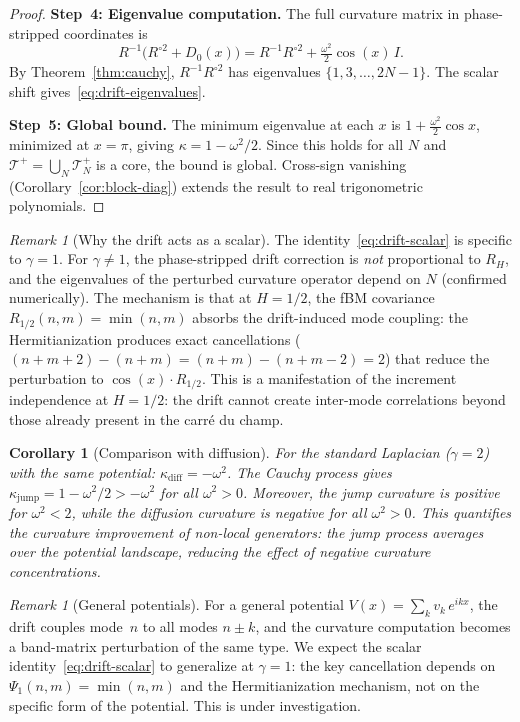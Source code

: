 \documentclass[11pt,a4paper]{article}
\theoremstyle{plain}
\newtheorem{corollary}[theorem]{Corollary}
\theoremstyle{definition}
\theoremstyle{remark}
\newtheorem{remark}[theorem]{Remark}
\begin{document}
\begin{proof}
\textbf{Step~4: Eigenvalue computation.}
The full curvature matrix in phase-stripped coordinates is
\[
  R^{-1}\bigl(R^{\circ 2} + D_0(x)\bigr)
  = R^{-1}R^{\circ 2} + \tfrac{\omega^2}{2}\cos(x)\,I.
\]
By Theorem~\ref{thm:cauchy}, $R^{-1}R^{\circ 2}$ has eigenvalues
$\{1,3,\ldots,2N{-}1\}$.  The scalar shift
gives~\eqref{eq:drift-eigenvalues}.

\textbf{Step~5: Global bound.}
The minimum eigenvalue at each $x$ is $1 + \frac{\omega^2}{2}\cos x$,
minimized at $x = \pi$, giving $\kappa = 1 - \omega^2/2$.
Since this holds for all $N$ and $\mathcal{T}^+ = \bigcup_N \mathcal{T}_N^+$
is a core, the bound is global.  Cross-sign vanishing
(Corollary~\ref{cor:block-diag}) extends the result to real
trigonometric polynomials.
\end{proof}

\begin{remark}[Why the drift acts as a scalar]
\label{rem:drift-scalar}
The identity~\eqref{eq:drift-scalar} is specific to $\gamma = 1$.
For $\gamma \neq 1$, the phase-stripped drift correction is
\emph{not} proportional to $R_H$, and the eigenvalues of the
perturbed curvature operator depend on $N$ (confirmed numerically).
The mechanism is that at $H = 1/2$, the fBM covariance
$R_{1/2}(n,m) = \min(n,m)$ absorbs the drift-induced
mode coupling: the Hermitianization produces exact cancellations
($(n{+}m{+}2)-(n{+}m) = (n{+}m)-(n{+}m{-}2) = 2$) that
reduce the perturbation to $\cos(x) \cdot R_{1/2}$.
This is a manifestation of the increment independence at
$H = 1/2$: the drift cannot create inter-mode correlations
beyond those already present in the carr\'e du champ.
\end{remark}

\begin{corollary}[Comparison with diffusion]\label{cor:comparison}
For the standard Laplacian ($\gamma = 2$) with the same potential:
$\kappa_{\mathrm{diff}} = -\omega^2$.
The Cauchy process gives
$\kappa_{\mathrm{jump}} = 1 - \omega^2/2 > -\omega^2$
for all $\omega^2 > 0$.  Moreover, the jump curvature is
positive for $\omega^2 < 2$, while the diffusion curvature
is negative for all $\omega^2 > 0$.  This quantifies the
curvature improvement of non-local generators: the jump process
averages over the potential landscape, reducing the effect of
negative curvature concentrations.
\end{corollary}

\begin{remark}[General potentials]\label{rem:potential-general}
For a general potential $V(x) = \sum_k v_k\,e^{ikx}$, the drift
couples mode~$n$ to all modes $n \pm k$, and the curvature
computation becomes a band-matrix perturbation of the same type.
We expect the scalar identity~\eqref{eq:drift-scalar} to
generalize at $\gamma = 1$: the key cancellation depends on
$\Psi_1(n,m) = \min(n,m)$ and the Hermitianization mechanism,
not on the specific form of the potential. This is under
investigation.
\end{remark}
\end{document}
